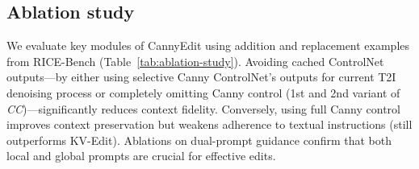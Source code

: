 \documentclass{article}
\begin{document}


\subsection{Ablation study}
We evaluate key modules of CannyEdit using addition and replacement examples from RICE-Bench (Table~\ref{tab:ablation-study}). Avoiding cached ControlNet outputs—by either using selective Canny ControlNet's outputs for current T2I denoising process or completely omitting Canny control (1st and 2nd variant of \emph{CC})—significantly reduces context fidelity. Conversely, using full Canny control improves context preservation but weakens adherence to textual instructions (still outperforms KV-Edit). Ablations on dual-prompt guidance confirm that both local and global prompts are crucial for effective edits.
\end{document}
